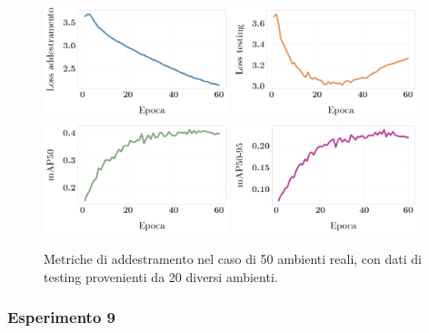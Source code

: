 \documentclass[12pt]{report}
\begin{document}
\begin{figure}[h!]
	\centering
	{\includegraphics[width=0.48\textwidth]{images/domain-shift/real-to-real/3/train-loss}}
	\hspace{0.01\textwidth}
	{\includegraphics[width=0.48\textwidth]{images/domain-shift/real-to-real/3/testing-loss}}
	\hspace{0.01\textwidth}
	\\
	{\includegraphics[width=0.48\textwidth]{images/domain-shift/real-to-real/3/map50}}
	\hspace{0.01\textwidth}
	{\includegraphics[width=0.48\textwidth]{images/domain-shift/real-to-real/3/map50-95}}
	\caption{Metriche di addestramento nel caso di 50 ambienti reali, con dati di testing provenienti da 20 diversi ambienti.}
	\label{fig:training-5}
\end{figure}

\subsubsection{Esperimento 9}
\label{sec:esperimento_9}
\end{document}
